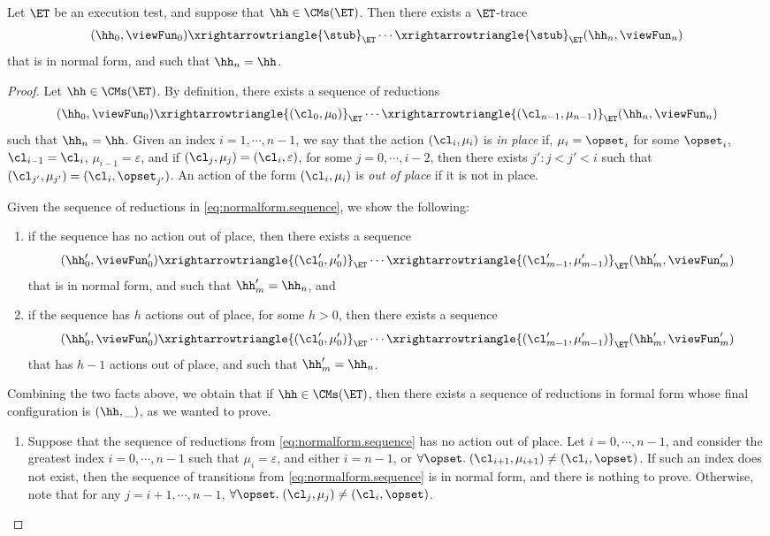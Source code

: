 \begin{proposition}
\label{prop:et.normalform}
Let $\ET$ be an execution test, and suppose that $\hh \in \CMs(\ET)$. Then there exists a $\ET$-trace  
\[
(\hh_0, \viewFun_0) \xrightarrowtriangle{\stub}_{\ET} \cdots \xrightarrowtriangle{\stub}_{\ET} (\hh_n, \viewFun_{n})
\]
that is in normal form, and such that $\hh_{n} = \hh$.
\end{proposition}
\begin{proof}
Let $\hh \in \CMs(\ET)$. By definition, there exists a sequence of reductions 
\begin{equation}
\label{eq:normalform.sequence}
(\hh_{0}, \viewFun_{0}) \xrightarrowtriangle{(\cl_0, \mu_0)}_{\ET} \cdots \xrightarrowtriangle{(\cl_{n-1}, \mu_{n-1})}_{\ET} (\hh_n, \viewFun_{n})
\end{equation}
such that $\hh_{n} = \hh$. Given an index $i = 1,\cdots, n-1$, we say that the action $(\cl_{i}, \mu_{i})$ is \emph{in place} 
if, $\mu_{i} = \opset_{i}$ for some $\opset_{i}$, $\cl_{i-1} = \cl_{i}$, $\mu_{i-1} = \varepsilon$, and if $(\cl_{j}, \mu_{j}) = (\cl_{i}, \varepsilon)$, 
for some  $j = 0,\cdots, i-2$, then there exists $j': j < j' < i$ such that $(\cl_{j'}, \mu_{j'}) = (\cl_i, \opset_{j'})$. An action of the 
form $(\cl_{i}, \mu_{i})$ is \emph{out of place} if it is not in place. 

Given the sequence of reductions in \cref{eq:normalform.sequence}, we show the following: 
\begin{enumerate}
\item if the sequence has no action out of place, then there exists a sequence 
\[
(\hh'_{0}, \viewFun'_{0}) \xrightarrowtriangle{(\cl'_{0}, \mu'_{0})}_{\ET} \cdots \xrightarrowtriangle{(\cl'_{m-1}, \mu'_{m-1})}_{\ET} (\hh'_{m}, \viewFun'_{m})
\]
that is in normal form, and such that $\hh'_{m} = \hh_{n}$, and 
\item if the sequence has $h$ actions out of place, for some $h > 0$, then there exists a sequence 
\[
(\hh'_{0}, \viewFun'_{0}) \xrightarrowtriangle{(\cl'_{0}, \mu'_{0})}_{\ET} \cdots \xrightarrowtriangle{(\cl'_{m-1}, \mu'_{m-1})}_{\ET} (\hh'_{m}, \viewFun'_{m})
\]
that has $h-1$ actions out of place, and such that $\hh'_{m} = \hh_{n}$.
\end{enumerate}
Combining the two facts above, we obtain that if $\hh \in \CMs(\ET)$, then there exists a sequence of reductions in formal form whose final 
configuration is $(\hh, \_)$, as we wanted to prove.

\begin{enumerate}
\item Suppose that the sequence of reductions from \cref{eq:normalform.sequence} has no action out of place. 
Let $i=0,\cdots, n-1$, and consider the greatest index $i=0,\cdots, n-1$ such that  
$\mu_{i} = \varepsilon$, and either $i = n-1$, or 
$\forall \opset.\; (\cl_{i+1}, \mu_{i+1}) \neq (\cl_{i}, \opset)$. 
If such an index does not exist, then the sequence of transitions from \cref{eq:normalform.sequence} is in 
normal form, and there is nothing to prove. Otherwise, note that for any $j = i+1,\cdots, n-1$, 
$\forall \opset.\;(\cl_{j}, \mu_{j}) \neq (\cl_{i}, \opset)$. 


\end{enumerate}
\end{proof}
